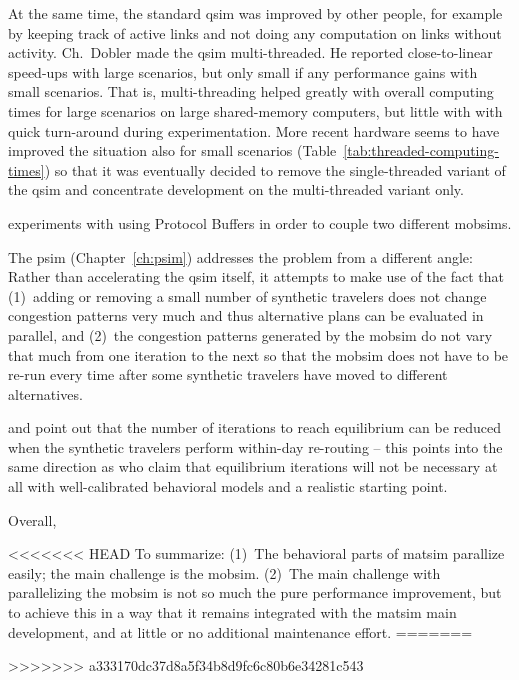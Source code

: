 At the same time, the standard \gls{qsim} was improved by other people, for example by keeping track of active links and not doing any computation on links without activity.  Ch.~Dobler made the \gls{qsim} multi-threaded.  He reported \citep[][Chapter~5]{Dobler_PhDThesis_2013} close-to-linear speed-ups with large scenarios, but only small if any performance gains with small scenarios.  That is, multi-threading helped greatly with overall computing times for large scenarios on large shared-memory computers, but little with with quick turn-around during experimentation.  More recent hardware seems to have improved the situation also for small scenarios (Table~\ref{tab:threaded-computing-times}) so that it was eventually decided to remove the single-threaded variant of the \gls{qsim} and concentrate development on the multi-threaded variant only.  

\cite{LaemmelEtAl2016hybridTRB} experiments with using Protocol Buffers \citep{ProtocolBuffersWww} in order to couple two different \glspl{mobsim}.

The \gls{psim} (Chapter~\ref{ch:psim}) addresses the problem from a different angle: Rather than accelerating the \gls{qsim} itself, it attempts to make use of the fact that (1)~adding or removing a small number of synthetic travelers does not change congestion patterns very much and thus alternative plans can be evaluated in parallel, and (2)~the congestion patterns generated by the \gls{mobsim} do not vary that much from one iteration to the next so that the \gls{mobsim} does not have to be re-run every time after some synthetic travelers have moved to different alternatives.

\cite{MaerkiEtAl_Transportation_2014} and \cite{Dobler_PhDThesis_2013} point out that the number of iterations to reach equilibrium can be reduced when the synthetic travelers perform within-day re-routing -- this points into the same direction as \cite{LuEtcBenAkiva2015SimMobility} who claim that equilibrium iterations will not be necessary at all with well-calibrated behavioral models and a realistic starting point.

Overall, 

<<<<<<< HEAD
To summarize: (1)~The behavioral parts of \gls{matsim} parallize easily; the main challenge is the \gls{mobsim}.  (2)~The main challenge with parallelizing the \gls{mobsim} is not so much the pure performance improvement, but to achieve this in a way that it remains integrated with the \gls{matsim} main development, and at little or no additional maintenance effort. 
=======

>>>>>>> a333170dc37d8a5f34b8d9fc6c80b6e34281c543



